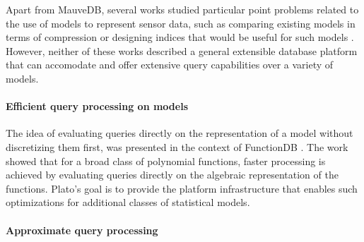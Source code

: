Apart from MauveDB, several works studied particular point problems related to the use of models to represent sensor data, such as comparing existing models in terms of compression or designing indices that would be useful for such models \cite{aberer-cloud, aberer-compression}. However, neither of these works described a general extensible database platform that can accomodate and offer extensive query capabilities over a variety of models.

\paragraph{Efficient query processing on models} The idea of evaluating queries directly on the representation of a model without discretizing them first, was presented in the context of FunctionDB \cite{functiondb}. The work showed that for a broad class of polynomial functions, faster processing is achieved by evaluating queries directly on the algebraic representation of the functions. Plato's goal is to provide the platform infrastructure that enables such optimizations for additional classes of statistical models.

\paragraph{Approximate query processing}
